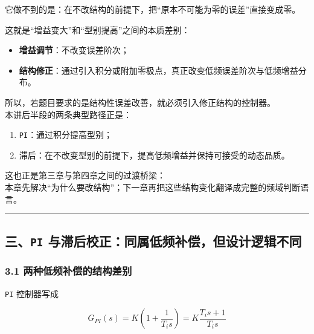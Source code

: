\documentclass[
  11pt]{article}
\providecommand{\tightlist}{%
  \setlength{\itemsep}{0pt}\setlength{\parskip}{0pt}}
\begin{document}
它做不到的是：在不改结构的前提下，把``原本不可能为零的误差''直接变成零。

这就是``增益变大''和``型别提高''之间的本质差别：

\begin{itemize}
\tightlist
\item
  \textbf{增益调节}：不改变误差阶次；
\item
  \textbf{结构修正}：通过引入积分或附加零极点，真正改变低频误差阶次与低频增益分布。
\end{itemize}

所以，若题目要求的是结构性误差改善，就必须引入修正结构的控制器。\\
本讲后半段的两条典型路径正是：

\begin{enumerate}
\def\labelenumi{\arabic{enumi}.}
\tightlist
\item
  \texttt{PI}：通过积分提高型别；
\item
  滞后：在不改变型别的前提下，提高低频增益并保持可接受的动态品质。
\end{enumerate}

这也正是第三章与第四章之间的过渡桥梁：\\
本章先解决``为什么要改结构''；下一章再把这些结构变化翻译成完整的频域判断语言。

\begin{center}\rule{0.5\linewidth}{0.5pt}\end{center}

\subsection{\texorpdfstring{三、\texttt{PI}
与滞后校正：同属低频补偿，但设计逻辑不同}{三、PI 与滞后校正：同属低频补偿，但设计逻辑不同}}\label{ux4e09pi-ux4e0eux6edeux540eux6821ux6b63ux540cux5c5eux4f4eux9891ux8865ux507fux4f46ux8bbeux8ba1ux903bux8f91ux4e0dux540c}

\subsubsection{3.1
两种低频补偿的结构差别}\label{ux4e24ux79cdux4f4eux9891ux8865ux507fux7684ux7ed3ux6784ux5deeux522b}

\texttt{PI} 控制器写成

\begin{equation}
G_{PI}(s)=K\left(1+\frac{1}{T_i s}\right)=K\frac{T_i s+1}{T_i s}
\tag{3-7-26}\label{eq:3-7-pi}
\end{equation}
\end{document}

